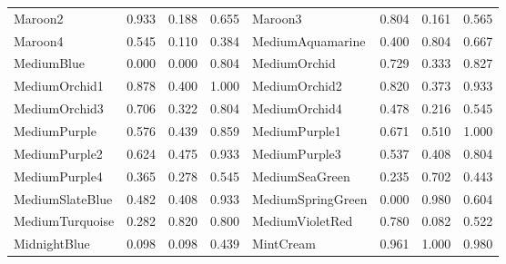 {\begin{center}
\begin{tabular}{|l|l|l|l|l|l|l|l|}
Maroon2             & 0.933 & 0.188 & 0.655 & Maroon3             & 0.804 & 0.161 & 0.565 \\ 
Maroon4             & 0.545 & 0.110 & 0.384 & MediumAquamarine    & 0.400 & 0.804 & 0.667 \\ 
MediumBlue          & 0.000 & 0.000 & 0.804 & MediumOrchid        & 0.729 & 0.333 & 0.827 \\ 
MediumOrchid1       & 0.878 & 0.400 & 1.000 & MediumOrchid2       & 0.820 & 0.373 & 0.933 \\ 
MediumOrchid3       & 0.706 & 0.322 & 0.804 & MediumOrchid4       & 0.478 & 0.216 & 0.545 \\ 
MediumPurple        & 0.576 & 0.439 & 0.859 & MediumPurple1       & 0.671 & 0.510 & 1.000 \\ 
MediumPurple2       & 0.624 & 0.475 & 0.933 & MediumPurple3       & 0.537 & 0.408 & 0.804 \\ 
MediumPurple4       & 0.365 & 0.278 & 0.545 & MediumSeaGreen      & 0.235 & 0.702 & 0.443 \\ 
MediumSlateBlue     & 0.482 & 0.408 & 0.933 & MediumSpringGreen   & 0.000 & 0.980 & 0.604 \\ 
MediumTurquoise     & 0.282 & 0.820 & 0.800 & MediumVioletRed     & 0.780 & 0.082 & 0.522 \\ 
MidnightBlue        & 0.098 & 0.098 & 0.439 & MintCream           & 0.961 & 1.000 & 0.980 \\ 
\hline
\end{tabular}
\end{center}

}
